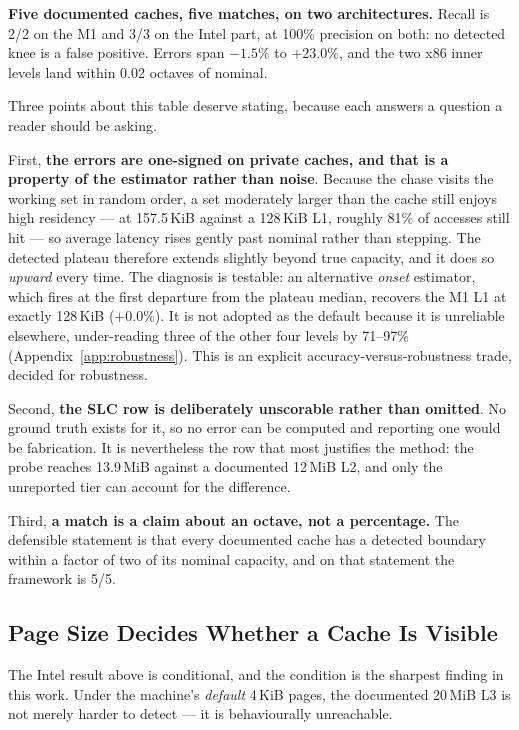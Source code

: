 \documentclass[conference]{IEEEtran}
\begin{document}
\textbf{Five documented caches, five matches, on two architectures.} Recall is
2/2 on the M1 and 3/3 on the Intel part, at 100\% precision on both: no detected
knee is a false positive. Errors span $-1.5\%$ to $+23.0\%$, and the two x86
inner levels land within 0.02 octaves of nominal.

Three points about this table deserve stating, because each answers a question a
reader should be asking.

First, \textbf{the errors are one-signed on private caches, and that is a
property of the estimator rather than noise}. Because the chase visits the
working set in random order, a set moderately larger than the cache still enjoys
high residency --- at 157.5\,KiB against a 128\,KiB L1, roughly 81\% of accesses
still hit --- so average latency rises gently past nominal rather than stepping.
The detected plateau therefore extends slightly beyond true capacity, and it does
so \emph{upward} every time. The diagnosis is testable: an alternative
\emph{onset} estimator, which fires at the first departure from the plateau
median, recovers the M1 L1 at exactly 128\,KiB ($+0.0\%$). It is not adopted as
the default because it is unreliable elsewhere, under-reading three of the other
four levels by 71--97\% (Appendix~\ref{app:robustness}). This is an explicit
accuracy-versus-robustness trade, decided for robustness.

Second, \textbf{the SLC row is deliberately unscorable rather than omitted}. No
ground truth exists for it, so no error can be computed and reporting one would
be fabrication. It is nevertheless the row that most justifies the method: the
probe reaches 13.9\,MiB against a documented 12\,MiB L2, and only the unreported
tier can account for the difference.

Third, \textbf{a match is a claim about an octave, not a percentage.} The
defensible statement is that every documented cache has a detected boundary
within a factor of two of its nominal capacity, and on that statement the
framework is 5/5.

\subsection{Page Size Decides Whether a Cache Is Visible}

The Intel result above is conditional, and the condition is the sharpest finding
in this work. Under the machine's \emph{default} 4\,KiB pages, the documented
20\,MiB L3 is not merely harder to detect --- it is behaviourally unreachable.
\end{document}
